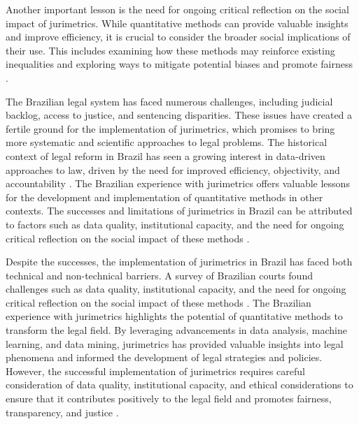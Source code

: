 Another important lesson is the need for ongoing critical reflection on the social impact of jurimetrics. While quantitative methods can provide valuable insights and improve efficiency, it is crucial to consider the broader social implications of their use. This includes examining how these methods may reinforce existing inequalities and exploring ways to mitigate potential biases and promote fairness \cite{costa2018}.

The Brazilian legal system has faced numerous challenges, including judicial backlog, access to justice, and sentencing disparities. These issues have created a fertile ground for the implementation of jurimetrics, which promises to bring more systematic and scientific approaches to legal problems. The historical context of legal reform in Brazil has seen a growing interest in data-driven approaches to law, driven by the need for improved efficiency, objectivity, and accountability \cite{10.1007/s11186-021-09453-1,unger2021process}. The Brazilian experience with jurimetrics offers valuable lessons for the development and implementation of quantitative methods in other contexts. The successes and limitations of jurimetrics in Brazil can be attributed to factors such as data quality, institutional capacity, and the need for ongoing critical reflection on the social impact of these methods \cite{10.1007/s11186-021-09453-1,international2015}.

Despite the successes, the implementation of jurimetrics in Brazil has faced both technical and non-technical barriers. A survey of Brazilian courts found challenges such as data quality, institutional capacity, and the need for ongoing critical reflection on the social impact of these methods \cite{10.1007/s11186-021-09453-1,international2015}. The Brazilian experience with jurimetrics highlights the potential of quantitative methods to transform the legal field. By leveraging advancements in data analysis, machine learning, and data mining, jurimetrics has provided valuable insights into legal phenomena and informed the development of legal strategies and policies. However, the successful implementation of jurimetrics requires careful consideration of data quality, institutional capacity, and ethical considerations to ensure that it contributes positively to the legal field and promotes fairness, transparency, and justice \cite{10.1007/s11186-021-09453-1,international2015}.

